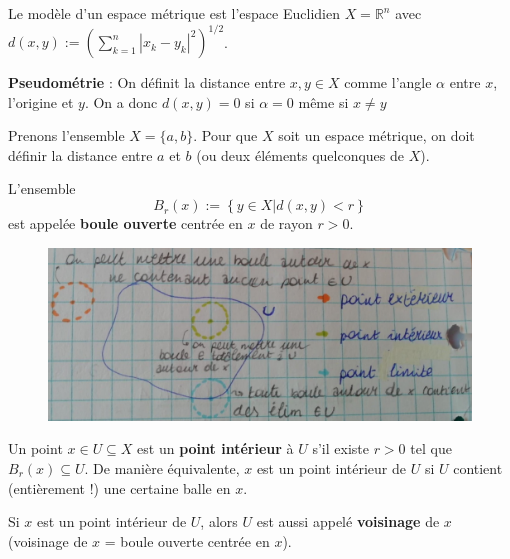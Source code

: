 \begin{example}
    Le modèle d'un espace métrique est l'espace Euclidien $X = \mathbb{R}^n$ avec $d(x,y) := \left( \sum_{k=1}^n |x_k - y_k|^2 \right)^{1/2}$.
\end{example}

\begin{example}
    \textbf{Pseudométrie} : On définit la distance entre $x,y \in X$ comme l'angle $\alpha$ entre $x$, l'origine et $y$. On a donc $d(x,y) = 0$ si $\alpha = 0$ même si $x \neq y$
\end{example}

\begin{example}
    Prenons l'ensemble $X = \{a,b\} $. Pour que $X$ soit un espace métrique, on doit définir la distance entre $a$ et $b$ (ou deux éléments quelconques de $X$).
\end{example}

\begin{definition}
    L'ensemble
    \begin{equation*}
        B_r(x) := \left\{ y\in X| d(x,y) < r \right\}
    \end{equation*}
    est appelée \textbf{boule ouverte} centrée en $x$ de rayon $r>0$.
\end{definition}

\begin{figure}[H]
    \centering
    \includegraphics[scale = 0.3]{synthese_BO.jpg}
\end{figure}

\begin{definition}
    Un point $x\in U\subseteq X$ est un \textbf{point intérieur} à $U$ s'il existe $r>0$ tel que $B_r(x) \subseteq U$. De manière équivalente, $x$ est un point intérieur de $U$ si $U$ contient (entièrement !) une certaine balle en $x$.
\end{definition}

\begin{definition}
    Si $x$ est un point intérieur de $U$, alors $U$ est aussi appelé \textbf{voisinage} de $x$ (voisinage de $x$ = boule ouverte centrée en $x$).
\end{definition}

